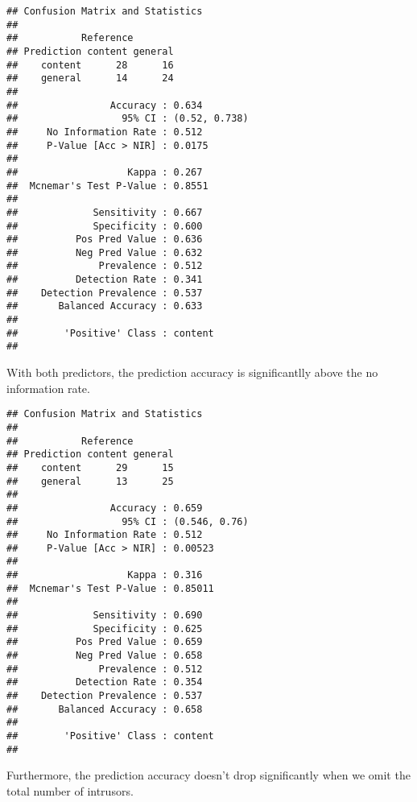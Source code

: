 \documentclass[12pt,]{article}
\begin{document}
\begin{verbatim}
## Confusion Matrix and Statistics
## 
##           Reference
## Prediction content general
##    content      28      16
##    general      14      24
##                                        
##                Accuracy : 0.634        
##                  95% CI : (0.52, 0.738)
##     No Information Rate : 0.512        
##     P-Value [Acc > NIR] : 0.0175       
##                                        
##                   Kappa : 0.267        
##  Mcnemar's Test P-Value : 0.8551       
##                                        
##             Sensitivity : 0.667        
##             Specificity : 0.600        
##          Pos Pred Value : 0.636        
##          Neg Pred Value : 0.632        
##              Prevalence : 0.512        
##          Detection Rate : 0.341        
##    Detection Prevalence : 0.537        
##       Balanced Accuracy : 0.633        
##                                        
##        'Positive' Class : content      
## 
\end{verbatim}

With both predictors, the prediction accuracy is significantlly above
the no information rate.

\begin{verbatim}
## Confusion Matrix and Statistics
## 
##           Reference
## Prediction content general
##    content      29      15
##    general      13      25
##                                        
##                Accuracy : 0.659        
##                  95% CI : (0.546, 0.76)
##     No Information Rate : 0.512        
##     P-Value [Acc > NIR] : 0.00523      
##                                        
##                   Kappa : 0.316        
##  Mcnemar's Test P-Value : 0.85011      
##                                        
##             Sensitivity : 0.690        
##             Specificity : 0.625        
##          Pos Pred Value : 0.659        
##          Neg Pred Value : 0.658        
##              Prevalence : 0.512        
##          Detection Rate : 0.354        
##    Detection Prevalence : 0.537        
##       Balanced Accuracy : 0.658        
##                                        
##        'Positive' Class : content      
## 
\end{verbatim}

Furthermore, the prediction accuracy doesn't drop significantly when we
omit the total number of intrusors.



\end{document}
